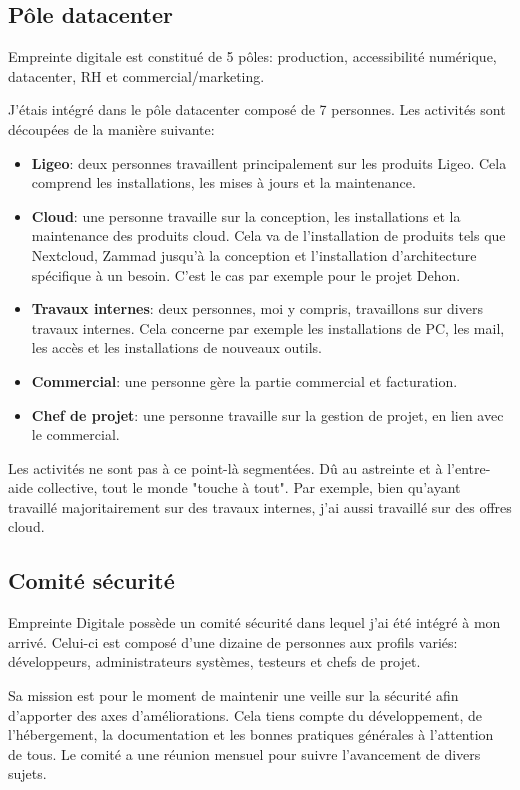 \documentclass[12pt]{article}
\begin{document}
\subsection{Pôle datacenter}
Empreinte digitale est constitué de 5 pôles: production, accessibilité numérique, datacenter, RH et commercial/marketing.

J'étais intégré dans le pôle datacenter composé de 7 personnes. 
Les activités sont découpées de la manière suivante:
\begin{itemize}
    \item \textbf{Ligeo}: deux personnes travaillent principalement sur les produits Ligeo. 
    Cela comprend les installations, les mises à jours et la maintenance.
    \item \textbf{Cloud}: une personne travaille sur la conception, les installations et la maintenance des produits cloud. 
    Cela va de l'installation de produits tels que \gls{Nextcloud}, Zammad jusqu'à la conception et l'installation d'architecture spécifique à un besoin. 
    C'est le cas par exemple pour le projet Dehon.
    \item \textbf{Travaux internes}: deux personnes, moi y compris, travaillons sur divers travaux internes. 
    Cela concerne par exemple les installations de PC, les mail, les accès et les installations de nouveaux outils.
    \item \textbf{Commercial}: une personne gère la partie commercial et facturation.
    \item \textbf{Chef de projet}: une personne travaille sur la gestion de projet, en lien avec le commercial.
\end{itemize}

Les activités ne sont pas à ce point-là segmentées. 
Dû au astreinte et à l'entre-aide collective, tout le monde "touche à tout". 
Par exemple, bien qu'ayant travaillé majoritairement sur des travaux internes, j'ai aussi travaillé sur des offres cloud.

\subsection{Comité sécurité}
Empreinte Digitale possède un comité sécurité dans lequel j'ai été intégré à mon arrivé.
Celui-ci est composé d'une dizaine de personnes aux profils variés: développeurs, administrateurs systèmes, testeurs et chefs de projet.

Sa mission est pour le moment de maintenir une veille sur la sécurité afin d'apporter des axes d'améliorations. 
Cela tiens compte du développement, de l'hébergement, la documentation et les bonnes pratiques générales à l'attention de tous. 
Le comité a une réunion mensuel pour suivre l'avancement de divers sujets.
\end{document}
